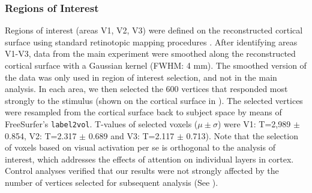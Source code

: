 \documentclass[9pt,lineno]{aperture}
\begin{document}
\subsubsection{Regions of Interest}
Regions of interest (areas V1, V2, V3) were defined on the reconstructed cortical surface using standard retinotopic mapping procedures \citep{Sereno1995,DeYoe1996,Engel1997}. After identifying areas V1-V3, data from the main experiment were smoothed along the reconstructed cortical surface with a Gaussian kernel (FWHM: 4 mm). The smoothed version of the data was only used in region of interest selection, and not in the main analysis. In each area, we then selected the 600 vertices that responded most strongly to the stimulus (shown on the cortical surface in ). The selected vertices were resampled from the cortical surface back to subject space by means of FreeSurfer's \texttt{label2vol}. T-values of selected voxels ($\mu \pm \sigma$) were V1: T=2,989 $\pm$ 0.854, V2: T=2.317 $\pm$ 0.689 and V3: T=2.117 $\pm$ 0.713). Note that the selection of voxels based on visual activation per se is orthogonal to the analysis of interest, which addresses the effects of attention on individual layers in cortex. Control analyses verified that our results were not strongly affected by the number of vertices selected for subsequent analysis (See ).
\end{document}
